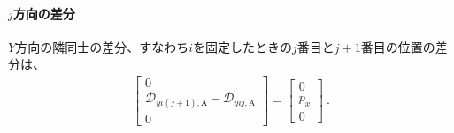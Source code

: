 \paragraph*{$j$方向の差分}
$Y$方向の隣同士の差分、すなわち$i$を固定したときの$j$番目と$j+1$番目の位置の差分は、
\begin{align*}
  \left[
  \begin{array}{c}
    0\\
    \mathcal D_{yi(j+1),\mathrm A}-\mathcal D_{yij,\mathrm A}\\
    0
  \end{array}
  \right]
  = \left[
    \begin{array}{c}
      0\\
      p_x\\
      0
    \end{array}
    \right]\ .
\end{align*}


\clearpage
